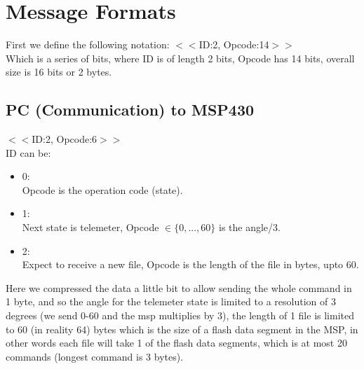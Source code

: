 \documentclass{article}
\begin{document}
\section{Message Formats}
First we define the following notation:
$<<$ID:2, Opcode:14$>>$\\
Which is a series of bits, where ID is of length 2 bits, Opcode has 14 bits, overall size is 16 bits or 2 bytes. 

\subsection{PC (Communication) to MSP430}
$<<$ID:2, Opcode:6$>>$\\
ID can be:
\begin{itemize}
    \item 0:\\
    Opcode is the operation code (state).
    \item 1:\\
    Next state is telemeter, Opcode $\in \{0,...,60\}$ is the angle/3.
    \item 2:\\
    Expect to receive a new file, Opcode is the length of the file in bytes, upto 60.
\end{itemize}
Here we compressed the data a little bit to allow sending the whole command in 1 byte, and so the angle for the telemeter state is limited to a resolution of 3 degrees (we send 0-60 and the msp multiplies by 3), the length of 1 file is limited to 60 (in reality 64) bytes which is the size of a flash data segment in the MSP, in other words each file will take 1 of the flash data segments, which is at most 20 commands (longest command is 3 bytes).

\newpage
\end{document}
